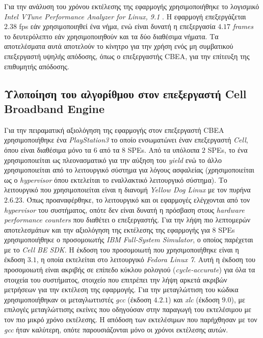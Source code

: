 Για την ανάλυση του χρόνου εκτέλεσης της εφαρμογής χρησιμοποιήθηκε το λογισμικό \textsl{Intel VTune Performance Analyzer for Linux, 9.1} \cite{intelvtune}. Η εφαρμογή επεξεργάζεται \(2.38\) \ac{fps} εάν χρησιμοποιηθεί ένα νήμα, ενώ είναι δυνατή η επεξεργασία \(4.17\) \textsl{frames} το δευτερόλεπτο εάν χρησιμοποιηθούν και τα δύο διαθέσιμα νήματα. Τα αποτελέσματα αυτά αποτελούν το κίνητρο για την χρήση ενός μη συμβατικού επεξεργαστή υψηλής απόδοσης, όπως ο επεξεργαστής \ac{CBEA}, για την επίτευξη της επιθυμητής απόδοσης.\newline \indent

\subsection[4.1.2 Υλοποίηση του αλγορίθμου στον επεξεργαστή Cell Broadband Engine]{Υλοποίηση του αλγορίθμου στον επεξεργαστή Cell Broadband Engine}
\label{subsection:sub412}
\indent
Για την πειραματική αξιολόγηση της εφαρμογής στον επεξεργαστή \ac{CBEA} χρησιμοποιήθηκε ένα \textsl{PlayStation3} το οποίο ενσωματώνει έναν επεξεργαστή \textsl{Cell}, όπου είναι διαθέσιμα μόνο τα \(6\) από τα \(8\) \acp{SPE}. Από τα υπόλοιπα \(2\) \acp{SPE}, το ένα χρησιμοποιείται ως πλεονασματικό για την αύξηση του \textsl{yield} ενώ το άλλο χρησιμοποιείται από το λειτουργικό σύστημα για λόγους ασφαλείας \cite{wikipediaps3} (χρησιμοποιείται ως ο \textsl{hypervisor} όπου εκτελείται το εναλλακτικό λειτουργικό σύστημα). Το λειτουργικό που χρησιμοποιείται είναι η διανομή \textsl{Yellow Dog Linux} με τον πυρήνα \(2.6.23\). Όπως προαναφέρθηκε, το λειτουργικό και οι εφαρμογές ελέγχονται από τον \textsl{hypervisor} του συστήματος, οπότε δεν είναι δυνατή η πρόσβαση στους \textsl{hardware performance counters} που διαθέτει ο επεξεργαστής.\newline \indent 
Για την λήψη πιο λεπτομερών αποτελεσμάτων και την αξιολόγηση της εκτέλεσης της εφαρμογής για \(8\) \acp{SPE} χρησιμοποιήθηκε ο προσομοιωτής \textsl{IBM Full-System Simulator}, ο οποίος παρέχεται με το \textsl{Cell BE SDK}. Η έκδοση του προσομοιωτή που χρησιμοποιήθηκε είναι η έκδοση \(3.1\), η οποία εκτελείται στο λειτουργικό \textsl{Fedora Linux 7}. Αυτή η έκδοση του προσομοιωτή είναι ακριβής σε επίπεδο κύκλου ρολογιού (\textsl{cycle-accurate}) για όλα τα στοιχεία του συστήματος, στοιχείο που επιτρέπει την λήψη αρκετά ακριβών μετρήσεων για την εκτέλεση της εφαρμογής. Για την μεταγλώττιση του κώδικα χρησιμοποιήθηκαν οι μεταγλωττιστές \textsl{gcc} (έκδοση \(4.2.1\)) και \textsl{xlc} (έκδοση \(9.0\)), με επιλογές μεταγλώττισης εκείνες που οδηγούσαν στην παραγωγή του εκτελέσιμου με τον πιο μικρό χρόνο εκτέλεσης. Η απόδοση των εκτελέσιμων που παρήχθησαν με τον \textsl{gcc} ήταν καλύτερη, οπότε παρουσιάζονται μόνο οι χρόνοι εκτέλεσης αυτών.\newline \indent


